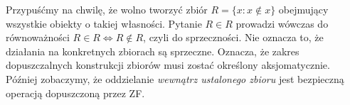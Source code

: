 \begin{uwaga}\label{rem:russell}
Przypuśćmy na chwilę, że wolno tworzyć zbiór
$R=\{x:x\notin x\}$ obejmujący wszystkie obiekty o takiej
własności. Pytanie $R\in R$ prowadzi wówczas do równoważności
$R\in R\iff R\notin R$, czyli do sprzeczności.
Nie oznacza to, że działania na konkretnych zbiorach są
sprzeczne. Oznacza, że zakres dopuszczalnych konstrukcji zbiorów
musi zostać określony aksjomatycznie. Później zobaczymy,
że oddzielanie \emph{wewnątrz ustalonego zbioru} jest bezpieczną
operacją dopuszczoną przez ZF.
\end{uwaga}
